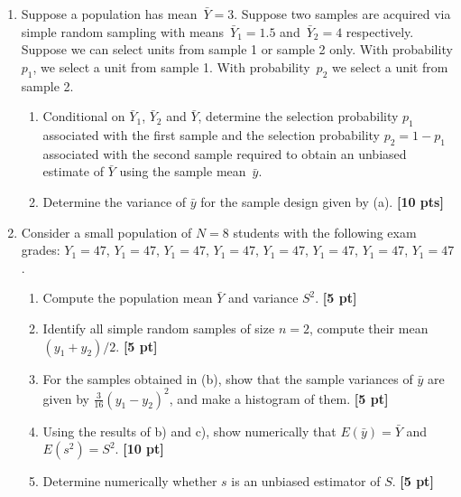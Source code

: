 \documentclass[12pt]{article}
\def\given{\, | \,}
\begin{document}
\begin{enumerate}
\begin{enumerate}
		\item Show that $E (X) = E(E(X \given C) )$ and $V(X) = V(E(X \given C)) + E(V(X \given C))$ {\bf [10 pt]}

		\end{enumerate}

\item Suppose a population has mean~$\bar Y = 3$. Suppose two samples are acquired via simple random sampling with means~$\bar Y_1 = 1.5$ and~$\bar Y_2 = 4$ respectively.  Suppose we can select units from sample 1 or sample 2 only.  With probability $p_1$, we select a unit from sample 1.  With probability~$p_2$ we select a unit from sample 2.

	\begin{enumerate}
		\item Conditional on $\bar Y_1$, $\bar Y_2$ and $\bar Y$, determine the selection probability $p_1$ associated with the first sample and the selection probability $p_2 = 1-p_1$ associated with the second sample required to obtain an unbiased estimate of $\bar Y$ using the sample mean~$\bar y$.
		\item Determine the variance of $\bar y$ for the sample design given by (a). {\bf [10 pts]}
	\end{enumerate}

\item Consider a small population of $N = 8$ students with the following exam grades: $Y_1 = 47$, $Y_1 = 47$, $Y_1 = 47$, $Y_1 = 47$, $Y_1 = 47$, $Y_1 = 47$, $Y_1 = 47$, $Y_1 = 47$.

	\begin{enumerate}
		\setlength{\itemsep}{15pt}%
		\setlength{\parskip}{15pt}%

		\item Compute the population mean $\bar Y$ and variance $S^2$. {\bf [5 pt]}
		\item Identify all simple random samples of size $n=2$, compute their mean $(y_1 + y_2)/2$. {\bf [5 pt]}
		\item For the samples obtained in (b), show that the sample variances of $\bar y$ are given by $\frac{3}{16} (y_1 - y_2)^2$, and make a histogram of them. {\bf [5 pt]}
		\item Using the results of b) and c), show numerically that $E(\bar y) = \bar Y$ and $E (s^2) = S^2$. {\bf [10 pt]}
		\item Determine numerically whether $s$ is an unbiased estimator of $S$. {\bf [5 pt]}
	\end{enumerate}


\end{enumerate}
\end{document}
